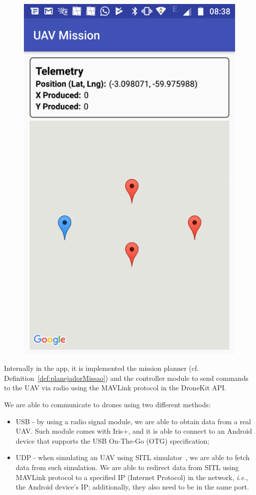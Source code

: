 \documentclass[12pt]{article}
\begin{document}
\begin{figure}[]
\begin{minipage}{.55\textwidth}
  \includegraphics[width=.7\linewidth]{appSec}
  \label{fig:appSec}
\end{minipage}
\end{figure}

Internally in the app, it is implemented the mission planner (cf. Definition~\ref{def:planejadorMissao}) and the controller module to send commands to the UAV via radio using the MAVLink protocol in the DroneKit API.

We are able to communicate to drones using two different methods:
\begin{itemize}
\item USB - by using a radio signal module, we are able to obtain data from a real UAV. Such module comes with Iris+, and it is able to connect to an Android device that supports the USB On-The-Go (OTG) specification;
\item UDP - when simulating an UAV using SITL simulator~\cite{team2016sitl}, we are able to fetch data from such simulation. We are able to redirect data from SITL using MAVLink protocol to a specified IP (Internet Protocol) in the network, \textit{i.e.}, the Android device's IP; additionally, they also need to be in the same port.
\end{itemize}
\end{document}
